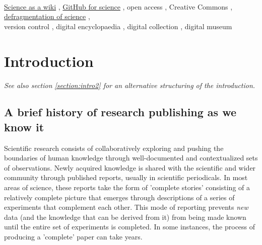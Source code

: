 \documentclass[final,authoryear,3p]{elsarticle-open-drafting}
\begin{document}
\begin{frontmatter}
\begin{abstract}
	\end{abstract}
	\date{\today}
	\begin{keyword}
		\mbox{}\\
		\href{http://www.science3point0.com/coaspedia/index.php/User:Daniel_Mietchen/Talks/GLAM-WIKI_UK_2010/Science_as_a_wiki}{Science as a wiki} \sep 
		\href{http://marciovm.com/i-want-a-github-of-science}{GitHub for science} \sep 
		open access \sep 
		Creative Commons \sep 
		\href{http://www.youtube.com/watch?v=UqYiqjzD_L0}{defragmentation of science} \sep \\
		version control \sep 
		digital encyclopaedia \sep 
		digital collection \sep 
		digital museum
	\end{keyword}

\end{frontmatter}
\newpage
\tableofcontents


\section{Introduction}
\label{section:intro}
{\it See also section \ref{section:intro2} for an alternative structuring of the introduction.}

\subsection{A brief history of research publishing as we know it}

Scientific research consists of collaboratively exploring and pushing the boundaries of human knowledge through well-documented and contextualized sets of observations. Newly acquired knowledge is shared with the scientific and wider community through published reports, usually in scientific periodicals. In most areas of science, these reports take the form of 'complete stories' consisting of a relatively complete picture that emerges through descriptions of a series of experiments that complement each other. This mode of reporting prevents {\it new} data (and the knowledge that can be derived from it) from being made known until the entire set of experiments is completed. In some instances, the process of producing a 'complete' paper can take years.
\end{document}
